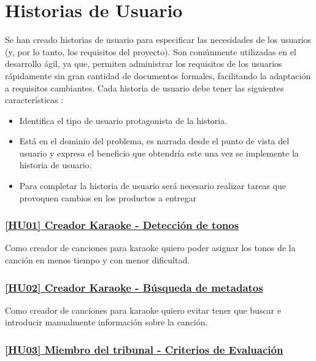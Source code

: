\section{Historias de Usuario}

Se han creado historias de usuario para especificar las necesidades de los usuarios (y, por lo tanto, los requisitos del proyecto). Son comúnmente utilizadas en el desarrollo ágil, ya que, permiten administrar los requisitos de los usuarios rápidamente sin gran cantidad de documentos formales, facilitando la adaptación a requisitos cambiantes. Cada historia de usuario debe tener las siguientes características \cite{hujj}:

\begin{itemize}
	\item{Identifica el tipo de usuario protagonista de la historia.}
	\item{Está en el dominio del problema, es narrada desde el punto de vista del usuario y expresa el beneficio que obtendría este una vez se implemente la historia de usuario.}
	\item{Para completar la historia de usuario será necesario realizar tareas que provoquen cambios en los productos a entregar}
\end{itemize}


\subsubsection*{\href{https://github.com/dipzza/ultrastar-song2txt/issues/7}{[HU01] Creador Karaoke - Detección de tonos}}

Como creador de canciones para karaoke quiero poder asignar los tonos de la canción en menos tiempo y con menor dificultad.

\subsubsection*{\href{https://github.com/dipzza/ultrastar-song2txt/issues/8}{[HU02] Creador Karaoke - Búsqueda de metadatos}}

Como creador de canciones para karaoke quiero evitar tener que buscar e introducir manualmente información sobre la canción.

\subsubsection*{\href{https://github.com/dipzza/ultrastar-song2txt/issues/9}{[HU03] Miembro del tribunal - Criterios de Evaluación}}

